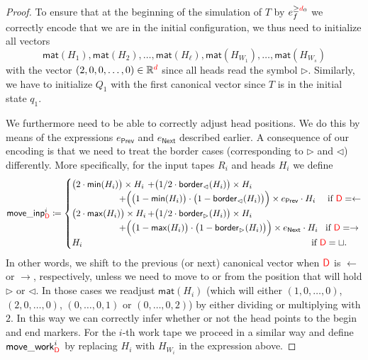 \begin{proof}
    To ensure that at the beginning of the simulation of $T$ by $e_f^{\geq {\color{red} d}_0}$ we correctly encode 
    that we are in the initial configuration, we thus need to initialize all vectors 
    $$\mathsf{mat}(H_1),\mathsf{mat}(H_2),\ldots, \mathsf{mat}(H_\ell), \mathsf{mat}(H_{W_1}),\ldots, \mathsf{mat}(H_{W_s})$$
    with the vector $(2,0,0,\ldots,0)\in\mathbb{R}^{\color{red} d}$ since all heads read the symbol $\rhd$. Similarly, 
    we have to initialize $Q_1$ with the first canonical vector since $T$ is in the initial state $q_1$.

    We furthermore need to be able to correctly adjust head positions. We do this by means of the expressions $e_{\mathsf{Prev}}$ and $e_{\mathsf{Next}}$	described earlier.
    A consequence of our encoding is that we need to treat the border cases (corresponding to $\rhd$ and 
    $\lhd$) differently. More specifically, for the input tapes $R_i$ and heads $H_i$ we define 
    $$
    \mathsf{move\_inp}^i_{\EDIT{\mathsf{D}}}\coloneqq 
    \begin{cases}
    \bigl(2\cdot\mathsf{min}(H_i)\bigr)\times H_i &\!\!\!\!\!+ \bigl(1/2\cdot\mathsf{border}_{\lhd}(H_i)\bigr)\times H_i \\
    & \hspace{-4em}+\Bigl(\bigl(1-\mathsf{min}(H_i)\bigr)\cdot\bigl(1-\mathsf{border}_{\lhd}(H_i)\bigr)\Bigr)\times e_{\mathsf{Prev}}\cdot H_i \quad \text{ if $\EDIT{\mathsf{D}}=\leftarrow$}\\
    \bigl(2\cdot \mathsf{max}(H_i)\bigr)\times H_i &\!\!\!\!\! + \bigl(1/2\cdot\mathsf{border}_{\rhd}(H_i)\bigr)\times H_i \\
    & \hspace{-4em}+ \Bigl( \bigl(1-\mathsf{max}(H_i)\bigr) \cdot \bigl(1-\mathsf{border}_{\rhd}(H_i)\bigr) \Bigr)\times e_{\mathsf{Next}}\cdot H_i  \quad\!\text{if $\EDIT{\mathsf{D}}=\rightarrow$}\\
    H_i & \hspace{17.5em}\!\text{if $\EDIT{\mathsf{D}}=\sqcup$}. 
    \end{cases}
    $$
    In other words, we shift to the previous (or next) canonical vector when ${\color{red} \mathsf{D}}$ is $\leftarrow$ 
    or $\rightarrow$, respectively, unless we need to move to or from the position that will hold $\rhd$ 
    or $\lhd$. In those cases we readjust $\mathsf{mat}(H_i)$ (which will either $(1,0,\ldots,0)$, $(2,0,\ldots,0)$, 
    $(0,\ldots,0,1)$ or $(0,\ldots,0,2)$) by either dividing or multiplying with $2$. In this way we can 
    correctly infer whether or not the head points to the begin and end markers. For the $i$-th work tape we 
    proceed in a similar way and define $\mathsf{move\_work}^i_{{\color{red} \mathsf{D}}}$ by replacing $H_{i}$ with $H_{W_i}$ in the expression above. 
 

\end{proof}
